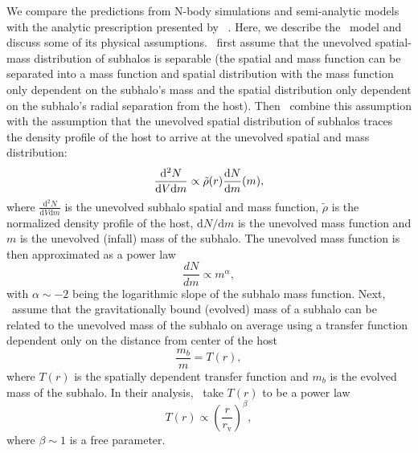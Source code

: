 \documentclass[%
 reprint,
 amsmath,
 amssymb,
 aps,
prd,
twocolumn,
superscriptaddress,
preprintnumbers,
floatfix,
nofootinbib
]{revtex4-2}
\def\hanetal{\citet{10.1093/mnras/stv2900}~}
\begin{document}
We compare the predictions from N-body simulations and semi-analytic models with the analytic prescription presented by \hanetal. 
Here, we describe the \hanetal model and discuss some of its physical assumptions.
\hanetal first assume that the unevolved spatial-mass distribution of subhalos is separable (the spatial and mass function can be separated into a mass function and spatial distribution with the mass function only dependent on the subhalo's mass and the spatial distribution only dependent on the subhalo's radial separation from the host). 
Then \hanetal combine this assumption with the assumption that the unevolved spatial distribution of subhalos traces the density profile of the host to arrive at the unevolved spatial and mass distribution:
\begin{equation}\label{eq_han_unevolved}
    \frac{\mathrm{d}^{2}N}{\mathrm{d}V\mathrm{d}m} \propto \Tilde{\rho}(r) \frac{\mathrm{d}N}{\mathrm{d}m}(m),
\end{equation}
where $\frac{\mathrm{d}^{2}N}{\mathrm{d}V\mathrm{d}m}$ is the unevolved subhalo spatial and mass function, $\tilde{\rho}$ is the normalized density profile of the host, $\mathrm{d}N/\mathrm{d}m$ is the unevolved mass function and $m$ is the unevolved (infall) mass of the subhalo.
The unevolved mass function is then approximated as a power law
\begin{equation}\label{eq_mf_unevolved}
    \frac{dN}{dm} \propto m^{\alpha}, 
\end{equation}
with $\alpha \sim -2$ being the logarithmic slope of the subhalo mass function. 
Next, \hanetal assume that the gravitationally bound (evolved) mass of a subhalo can be related to the unevolved mass of the subhalo on average using a transfer function dependent only on the distance from center of the host 
\begin{equation}\label{eq_han_transfer_1}
    \frac{m_{b}}{m} = T(r), 
\end{equation}
where $T(r)$ is the spatially dependent transfer function and $m_b$ is the evolved mass of the subhalo.
In their analysis, \hanetal take $T(r)$ to be a power law
\begin{equation}\label{eq_han_transfer}
    T(r) \propto \left(\frac{r}{r_{\mathrm{v}}}\right)^{\beta},
\end{equation}
where $\beta \sim 1$ is a free parameter.
\end{document}

